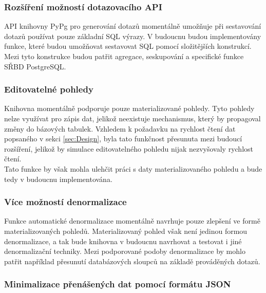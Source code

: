 \documentclass[ing,male,java,dept456]{diploma}						%
\begin{document}
\subsubsection{Rozšíření možností dotazovacího API}

API knihovny PyPg pro generování dotazů momentálně umožňuje při sestavování dotazů používat pouze základní SQL výrazy. V budoucnu budou implementovány funkce, které budou umožňovat sestavovat SQL pomocí složitějších konstrukcí. Mezi tyto konstrukce budou patřit agregace, seskupování a specifické funkce SŘBD PostgreSQL.

\subsubsection{Editovatelné pohledy}

Knihovna momentálně podporuje pouze materializované pohledy. Tyto pohledy nelze využívat pro zápis dat, jelikož neexistuje mechanismus, který by propagoval změny do bázových tabulek. Vzhledem k požadavku na rychlost čtení dat popsaného v sekci \ref{sec:Design}, byla tato funkčnost přesunuta mezi budoucí rozšíření, jelikož by simulace editovatelného pohledu nijak nezvyšovaly rychlost čtení. \\
Tato funkce by však mohla ulehčit práci s daty materializovaného pohledu a bude tedy v budoucnu implementována.

\subsubsection{Více možností denormalizace}

Funkce automatické denormalizace momentálně navrhuje pouze zlepšení ve formě materializovaných pohledů. Materializovaný pohled však není jedinou formou denormalizace, a tak bude knihovna v budoucnu navrhovat a testovat i jiné denormalizační techniky. Mezi podporované podoby denormalizace by mohlo patřit například přesunutí databázových sloupců na základě prováděných dotazů.

\subsubsection{Minimalizace přenášených dat pomocí formátu JSON}
\end{document}
